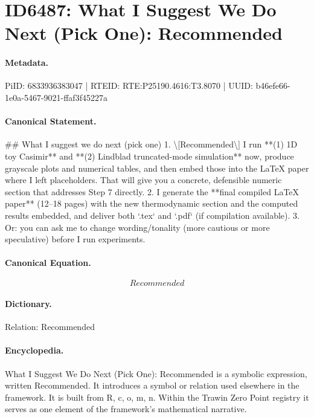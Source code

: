 \section*{ID6487: What I Suggest We Do Next (Pick One): Recommended}
\paragraph{Metadata.}
PiID: 6833936383047 | RTEID: RTE:P25190.4616:T3.8070 | UUID: b46efe66-1e0a-5467-9021-ffaf3f45227a

\paragraph{Canonical Statement.}
\#\# What I suggest we do next (pick one) 1. \textbackslash{}[Recommended\textbackslash{}] I run **(1) 1D toy Casimir** and **(2) Lindblad truncated-mode simulation** now, produce grayscale plots and numerical tables, and then embed those into the LaTeX paper where I left placeholders. That will give you a concrete, defensible numeric section that addresses Step 7 directly. 2. I generate the **final compiled LaTeX paper** (12–18 pages) with the new thermodynamic section and the computed results embedded, and deliver both `.tex` and `.pdf` (if compilation available). 3. Or: you can ask me to change wording/tonality (more cautious or more speculative) before I run experiments.

\paragraph{Canonical Equation.}
\[
Recommended
\]

\paragraph{Dictionary.}
Relation: Recommended

\paragraph{Encyclopedia.}
What I Suggest We Do Next (Pick One): Recommended is a symbolic expression, written Recommended. It introduces a symbol or relation used elsewhere in the framework. It is built from R, c, o, m, n. Within the Trawin Zero Point registry it serves as one element of the framework's mathematical narrative.
